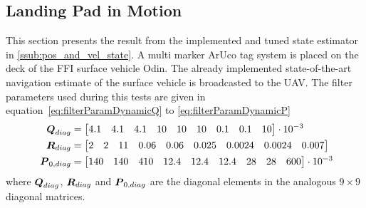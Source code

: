 \subsection{Landing Pad in Motion} %
\label{sub:landing_pad_at_speed}
This section presents the result from the implemented and tuned state estimator in \ref{ssub:pos_and_vel_state}. A multi marker ArUco tag system is placed on the deck of the \gls{FFI} surface vehicle Odin. The already implemented state-of-the-art navigation estimate of the surface vehicle is broadcasted to the \gls{UAV}. The filter parameters used during this tests are given in equation~\ref{eq:filterParamDynamicQ} to \ref{eq:filterParamDynamicP}
\begin{align}\label{eq:filterParamDynamicQ}
	\boldsymbol{Q}_{diag}&=
	\begin{bmatrix}
		 4.1&4.1&4.1&10&10&10&0.1&0.1&10
	\end{bmatrix}\cdot 10^{-3}\\
	\boldsymbol{R}_{diag}&=
	\begin{bmatrix}
		2&2&11&0.06&0.06&0.025&0.0024&0.0024&0.007
	\end{bmatrix}\\\
	\boldsymbol{P}_{0,diag}&=
	\begin{bmatrix}
		140&140&410&12.4&12.4&12.4&28&28&600
	\end{bmatrix}\cdot 10^{-3}\label{eq:filterParamDynamicP}
\end{align}
where $\boldsymbol{Q}_{diag}$, $\boldsymbol{R}_{diag}$ and $\boldsymbol{P}_{0,diag}$ are the diagonal elements in the analogous $9\times9$ diagonal matrices.

